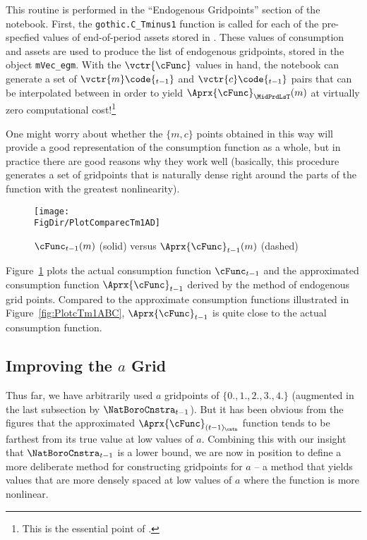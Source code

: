 This routine is performed in the ``Endogenous Gridpoints'' section of the notebook. First, the \texttt{gothic.C\_Tminus1} function is called for each of the pre-specfied values of end-of-period assets stored in . These values of consumption and assets are used to produce the list of endogenous gridpoints, stored in the object \texttt{mVec\_egm}. With the $\vctr{\cFunc}$ values in hand, the notebook can generate a set of $\vctr{m}\code{_{t-1}}$ and ${\vctr{c}\code{_{t-1}}}$ pairs that can be interpolated between in order to yield $\Aprx{\cFunc}_{\MidPrdLsT}(m)$ at virtually zero computational cost!\footnote{This is the essential point of \cite{carrollEGM}.} %

\hypertarget{PlotComparecTm1AD}{}
One might worry about whether the $\{{m},c\}$ points obtained in this way will provide a good representation of the consumption function as a whole, but in practice there are good reasons why they work well (basically, this procedure generates a set of gridpoints that is naturally dense right around the parts of the function with the greatest nonlinearity).
\begin{figure}
  \centerline{\texttt{[image: \\FigDir/PlotComparecTm1AD]}}
  \caption{$\cFunc_{t-1}(m)$ (solid) versus $\Aprx{\cFunc}_{t-1}(m)$ (dashed)}
  \label{fig:ComparecTm1AD}
\end{figure}
Figure~\ref{fig:ComparecTm1AD} plots the actual consumption function $\cFunc_{t-1}$ and the approximated consumption function $\Aprx{\cFunc}_{t-1}$ derived by the method of endogenous grid points. Compared to the approximate consumption functions illustrated in Figure~\ref{fig:PlotcTm1ABC}, $\Aprx{\cFunc}_{t-1}$ is quite close to the actual consumption function.



\hypertarget{improving-the-a-grid}{}
\subsection{Improving the $a$ Grid}\label{subsec:improving-the-a-grid}

Thus far, we have arbitrarily used $a$ gridpoints of $\{0.,1.,2.,3.,4.\}$ (augmented in the last subsection by $\NatBoroCnstra_{t-1}$).  But it has been obvious from the figures that the approximated $\Aprx{\cFunc}_{(t-1)_\cntn}$ function tends to be farthest from its true value at low values of $a$.  Combining this with our insight that $\NatBoroCnstra_{t-1}$ is a lower bound, we are now in position to define a more deliberate method for constructing gridpoints for $a$ -- a method that yields values that are more densely spaced at low values of $a$ where the function is more nonlinear.

